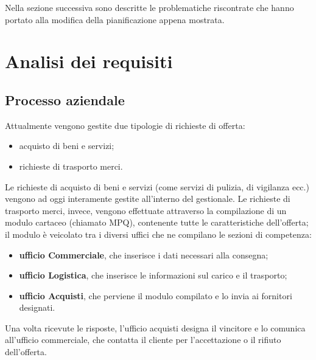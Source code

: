 Nella sezione successiva sono descritte le problematiche riscontrate che hanno portato alla modifica della pianificazione appena mostrata.
\newpage



\section{Analisi dei requisiti}

\subsection{Processo aziendale}

Attualmente vengono gestite due tipologie di richieste di offerta:
\begin{itemize}
	\item acquisto di beni e servizi;
	\item richieste di trasporto merci.
\end{itemize}
Le richieste di acquisto di beni e servizi (come servizi di pulizia, di vigilanza ecc.) vengono ad oggi interamente gestite all'interno del gestionale. 
Le richieste di trasporto merci, invece, vengono effettuate attraverso la compilazione di un modulo cartaceo (chiamato MPQ), contenente tutte le caratteristiche dell'offerta; il modulo è veicolato tra i diversi uffici che ne compilano le sezioni di competenza:
\begin{itemize}
	\item \textbf{ufficio Commerciale}, che inserisce i dati necessari alla consegna;
	\item \textbf{ufficio Logistica}, che inserisce le informazioni sul carico e il trasporto;
	\item \textbf{ufficio Acquisti}, che perviene il modulo compilato e lo invia ai fornitori designati.
\end{itemize}
Una volta ricevute le risposte, l'ufficio acquisti designa il vincitore e lo comunica all'ufficio commerciale, che contatta il cliente per l'accettazione o il rifiuto dell'offerta.


